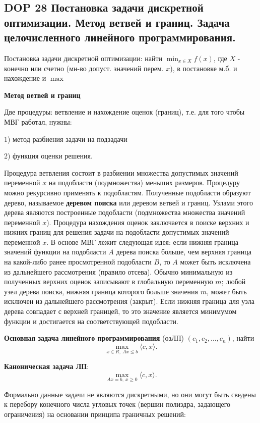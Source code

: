 \subsection*{DOP 28 Постановка задачи дискретной оптимизации. Метод ветвей и границ. Задача целочисленного линейного программирования.}

Постановка задачи дискретной оптимизации: найти $\min_{x \in X} f(x)$, где $X$ - конечно или счетно (мн-во допуст. значений перем. $x$), в постановке м.б. и нахождение и $\max$

\textbf{Метод ветвей и границ}

Две процедуры: ветвление и нахождение оценок (границ), т.е. для того чтобы МВГ работал, нужны:

1) метод разбиения задачи на подзадачи

2) функция оценки решения.

Процедура ветвления состоит в разбиении множества допустимых значений переменной $x$ на подобласти (подмножества) меньших размеров.
Процедуру можно рекурсивно применять к подобластям.
Полученные подобласти образуют дерево, называемое \textbf{деревом поиска} или деревом ветвей и границ. Узлами этого дерева являются построенные подобласти (подмножества множества значений переменной $x$).
Процедура нахождения оценок заключается в поиске верхних и нижних границ для решения задачи на подобласти допустимых значений переменной $x$. В основе МВГ лежит следующая идея: если нижняя граница значений функции на подобласти $A$ дерева поиска больше, чем верхняя граница на какой-либо ранее просмотренной подобласти $B$, то $A$ может быть исключена из дальнейшего рассмотрения (правило отсева).
Обычно минимальную из полученных верхних оценок записывают в глобальную переменную $m$; любой узел дерева поиска, нижняя граница которого больше значения $m$, может быть исключен из дальнейшего рассмотрения (закрыт).
Если нижняя граница для узла дерева совпадает с верхней границей, то это значение является минимумом функции и достигается на соответствующей подобласти.

\textbf{Основная задача линейного программирования} (озЛП) $(c_1, c_2, \dots , c_n)$, найти
$$\max_{x \in R,~Ax \leqslant b} \langle c, x \rangle.$$

\textbf{Каноническая задача ЛП}:
$$\max_{Ax = b,~x \geqslant 0} \langle c, x \rangle.$$

Формально данные задачи не являются дискретными, но они могут быть сведены к перебору конечного числа угловых точек (вершин полиэдра, задающего ограничения) на основании принципа граничных решений:

